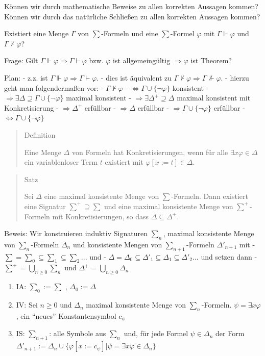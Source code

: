 \documentclass[a4paper]{article}
\begin{document}
\begin{multicols}{3}
  Können wir durch mathematische Beweise zu allen korrekten Aussagen
  kommen? Können wir durch das natürliche Schließen zu allen korrekten
  Aussagen kommen?

  Existiert eine Menge $\Gamma$ von $\sum$-Formeln und eine $\sum$-Formel
  $\varphi$ mit $\Gamma\Vdash\varphi$ und $\Gamma\not\vdash\varphi$?

  Frage: Gilt $\Gamma\Vdash\varphi \Rightarrow \Gamma\vdash\varphi$ bzw.
  $\varphi$ ist allgemeingültig $\Rightarrow\varphi$ ist Theorem?

  Plan: - z.z. ist $\Gamma\Vdash\varphi \Rightarrow \Gamma\vdash\varphi$.
  - dies ist äquivalent zu
  $\Gamma\not\vdash\varphi \Rightarrow \Gamma\not\Vdash\varphi$. - hierzu
  geht man folgendermaßen vor: - $\Gamma\not\vdash\varphi$ -
  $\Leftrightarrow \Gamma\cup\{\lnot\varphi\}$ konsistent -
  $\Rightarrow \exists\Delta\supseteq\Gamma\cup\{\lnot\varphi\}$ maximal
  konsistent - $\Rightarrow \exists\Delta^+ \supseteq\Delta$ maximal
  konsistent mit Konkretisierung - $\Rightarrow \Delta^+$ erfüllbar -
  $\Rightarrow \Delta$ erfüllbar -
  $\Rightarrow \Gamma\cup\{\lnot\varphi\}$ erfüllbar -
  $\Leftrightarrow \Gamma\cup\{\lnot\varphi\}$

  \begin{quote}
    Definition

    Eine Menge $\Delta$ von Formeln hat Konkretisierungen, wenn für alle
    $\exists x\varphi\in\Delta$ ein variablenloser Term $t$ existiert mit
    $\varphi[x:=t]\in\Delta$.
  \end{quote}

  \begin{quote}
    Satz

    Sei $\Delta$ eine maximal konsistente Menge von $\sum$-Formeln. Dann
    existiert eine Signatur $\sum^+ \supseteq\sum$ und eine maximal
    konsistente Menge von $\sum^+$-Formeln mit Konkretisierungen, so dass
    $\Delta\subseteq\Delta^+$.
  \end{quote}

  Beweis: Wir konstruieren induktiv Signaturen $\sum_n$, maximal
  konsistente Menge von $\sum_n$-Formeln $\Delta_n$ und konsistente Mengen
  von $\sum_{n+1}$-Formeln $\Delta'_{n+1}$ mit -
  $\sum =\sum_0 \subseteq\sum_1 \subseteq\sum_2...$ und -
  $\Delta = \Delta_0 \subseteq \Delta'_1 \subseteq\Delta_1 \subseteq\Delta'_2...$
  und setzen dann - $\sum^+ =\bigcup_{n\geq 0} \sum_n$ und
  $\Delta^+ = \bigcup_{n\geq 0} \Delta_n$

  \begin{enumerate}
    \itemsep1pt\parskip0pt
    \item
          IA: $\sum_0 := \sum$ , $\Delta_0:=\Delta$
    \item
          IV: Sei $n\geq 0$ und $\Delta_n$ maximal konsistente Menge von
          $\sum_n$-Formeln. $\psi=\exists x\varphi$, ein ``neues''
          Konstantensymbol $c_{\psi}$
    \item
          IS: $\sum_{n+1}$: alle Symbole aus $\sum_n$ und, für jede Formel
          $\psi\in\Delta_n$ der Form
          $\Delta'_{n+1}:= \Delta_n\cup\{\varphi[x:=c_{\psi}]|\psi=\exists x\varphi\in\Delta_n\}$


\end{enumerate}
\end{multicols}
\end{document}
